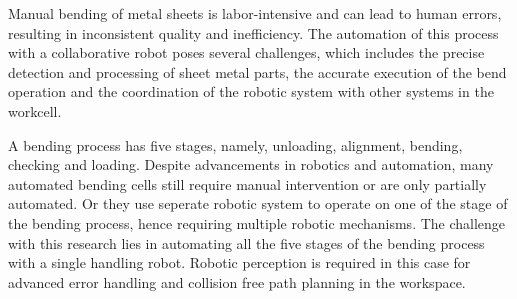 Manual bending of metal sheets is labor-intensive and can 
lead to human errors, resulting in inconsistent quality
and inefficiency. 
The automation of this process with a collaborative robot poses
several challenges, which includes the precise detection and processing of sheet metal parts, the accurate execution of
the bend operation and the coordination of
the robotic system with other systems in the workcell.

A bending process has five stages, namely, unloading, alignment, bending, checking and loading.
Despite advancements in robotics and automation, many automated bending cells still require manual intervention or are only partially automated. Or they use seperate robotic system to operate on one of the stage of the bending process, hence requiring multiple robotic mechanisms. The challenge with this research lies in automating all the five stages of the bending process with a single handling robot. Robotic perception is required in this case for advanced error handling and collision free path planning in the workspace.
